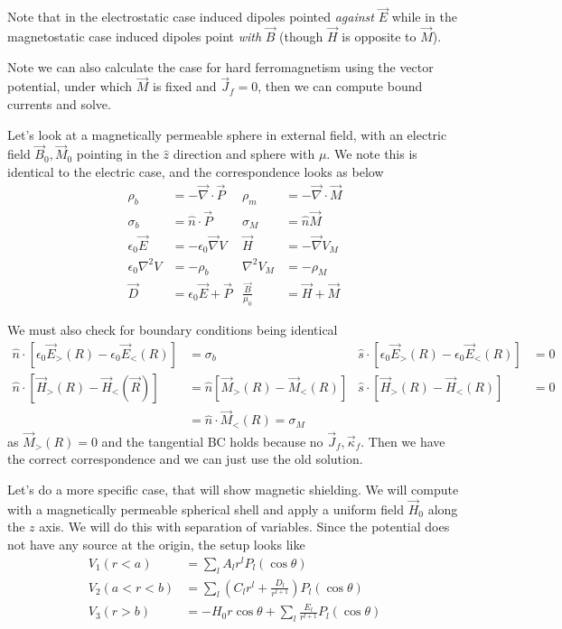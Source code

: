 \documentclass[10pt]{report}
\begin{document}
Note that in the electrostatic case induced dipoles pointed \emph{against} $\vec{E}$ while in the magnetostatic case induced dipoles point \emph{with} $\vec{B}$ (though $\vec{H}$ is opposite to $\vec{M}$). 

Note we can also calculate the case for hard ferromagnetism using the vector potential, under which $\vec{M}$ is fixed and $\vec{J}_f = 0$, then we can compute bound currents and solve.

Let's look at a magnetically permeable sphere in external field, with an electric field $\vec{B}_0, \vec{M}_0$ pointing in the $\hat{z}$ direction and sphere with $\mu$. We note this is identical to the electric case, and the correspondence looks as below
\begin{align}
    \rho_b &= -\vec{\nabla}\cdot\vec{P} & \rho_m &= -\vec{\nabla}\cdot \vec{M}\\
    \sigma_b &= \hat{n}\cdot \vec{P} & \sigma_M &= \hat{n} \vec{M}\\
    \epsilon_0 \vec{E} &= -\epsilon_0 \vec{\nabla}V & \vec{H} &= -\vec{\nabla}V_M\\ 
    \epsilon_0\nabla^2V &= -\rho_b & \nabla^2 V_M &= -\rho_M\\
    \vec{D} &= \epsilon_0\vec{E} + \vec{P} & \frac{\vec{B}}{\mu_0} &= \vec{H} + \vec{M}
\end{align}

We must also check for boundary conditions being identical
\begin{align}
    \hat{n} \cdot \left[ \epsilon_0 \vec{E}_>(R) - \epsilon_0\vec{E}_<(R) \right] &= \sigma_b & \hat{s} \cdot \left[ \epsilon_0 \vec{E}_>(R) - \epsilon_0\vec{E}_<(R) \right] &= 0\\
    \hat{n}\cdot \left[ \vec{H}_>(R) - \vec{H}_<(\vec{R}) \right] &= \hat{n}\left[ \vec{M}_>(R) - \vec{M}_<(R) \right] & \hat{s} \cdot \left[ \vec{H}_>(R) - \vec{H}_<(R) \right] &= 0\\
    &= \hat{n}\cdot\vec{M}_<(R) = \sigma_M
\end{align}
as $\vec{M}_>(R) = 0$ and the tangential BC holds because no $\vec{J}_f, \vec{\kappa}_f$. Then we have the correct correspondence and we can just use the old solution. 

Let's do a more specific case, that will show magnetic shielding. We will compute with a magnetically permeable spherical shell and apply a uniform field $\vec{H}_0$ along the $z$ axis. We will do this with separation of variables. Since the potential does not have any source at the origin, the setup looks like
\begin{align}
    V_1(r < a) &= \sum_{l}^{}A_lr^lP_l(\cos\theta)\\
    V_2(a < r < b) &= \sum_{l}^{}\left( C_lr^l + \frac{D_l}{r^{l+1}} \right)P_l(\cos\theta)\\
    V_3(r > b) &= -H_0r\cos\theta + \sum_{l}^{}\frac{E_l}{r^{l+1}}P_l(\cos\theta)
\end{align}
\end{document}
